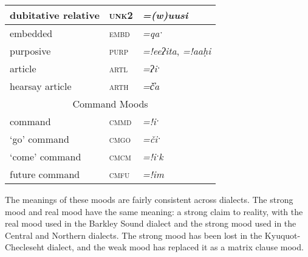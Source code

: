 \begin{table}[ht]
\begin{tabular}{lll}
\multicolumn{1}{|l|}{dubitative relative}  & \multicolumn{1}{l|}{\textsc{unk2}} & \multicolumn{1}{l|}{\textit{=(w)uusi}}          \\ \hline
\multicolumn{1}{|l|}{embedded}             & \multicolumn{1}{l|}{\textsc{embd}} & \multicolumn{1}{l|}{\textit{=qaˑ}}              \\ \hline
\multicolumn{1}{|l|}{purposive}            & \multicolumn{1}{l|}{\textsc{purp}} & \multicolumn{1}{l|}{\textit{=!eeʔita}, \textit{=!aaḥi}}  \\ \hline
\multicolumn{1}{|l|}{article\footnotemark}              & \multicolumn{1}{l|}{\textsc{artl}} & \multicolumn{1}{l|}{\textit{=ʔiˑ}}              \\ \hline
\multicolumn{1}{|l|}{hearsay article}      & \multicolumn{1}{l|}{\textsc{arth}} & \multicolumn{1}{l|}{\textit{=č̓a}}             \\ \hline
\multicolumn{3}{|c|}{Command Moods} \\ \hline
\multicolumn{1}{|l|}{command}              & \multicolumn{1}{l|}{\textsc{cmmd}} & \multicolumn{1}{l|}{\textit{=!iˑ}}              \\ \hline
\multicolumn{1}{|l|}{`go' command}         & \multicolumn{1}{l|}{\textsc{cmgo}} & \multicolumn{1}{l|}{\textit{=čiˑ}}             \\ \hline
\multicolumn{1}{|l|}{`come' command}       & \multicolumn{1}{l|}{\textsc{cmcm}} & \multicolumn{1}{l|}{\textit{=!iˑk}}             \\ \hline
\multicolumn{1}{|l|}{future command}       & \multicolumn{1}{l|}{\textsc{cmfu}} & \multicolumn{1}{l|}{\textit{=!im}}              \\ \hline
\end{tabular}
\end{table}

\addtocounter{footnote}{-1}
\addtocounter{footnote}{1}

The meanings of these moods are fairly consistent across dialects. The strong mood and real mood have the same meaning: a strong claim to reality, with the real mood used in the Barkley Sound dialect and the strong mood used in the Central and Northern dialects. The strong mood has been lost in the Kyuquot-Checleseht dialect, and the weak mood has replaced it as a matrix clause mood.

